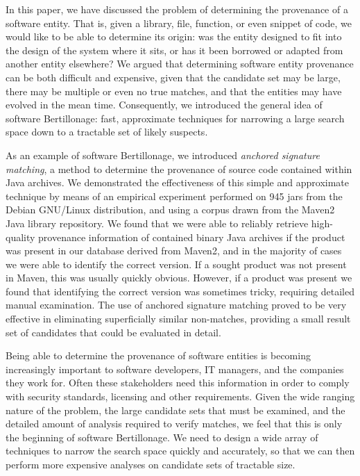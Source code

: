 \label{sec:conclusion}
\label{concl}

In this paper, we have discussed the problem of determining the provenance
of a software entity.  That is, given a library, file, function, or even
snippet of code, we would like to be able to determine its origin:  was the
entity designed to fit into the design of the system where it sits, or has
it been borrowed or adapted from another entity elsewhere?  We argued that
determining software entity provenance can be both difficult and expensive,
given that the candidate set may be large, there may be multiple or even no
true matches, and that the entities may have evolved in the mean time.
Consequently, we introduced the general idea of software Bertillonage:
fast, approximate techniques for narrowing a large search space down to a
tractable set of likely suspects.

As an example of software Bertillonage, we introduced \emph{anchored
signature matching}, a method to determine the provenance of source code
contained within Java archives.  We demonstrated the effectiveness of this
simple and approximate technique by means of an empirical experiment
performed on 945 jars from the Debian GNU/Linux distribution, and using a corpus drawn from
the Maven2 Java library repository.  We found that we were able to reliably
retrieve high-quality provenance information of contained binary Java archives
if the product was present in our database derived from Maven2, and in the majority of cases we were
able to identify the correct version.  If a sought product was not present
in Maven, this was usually quickly obvious.  However, if a product was
present we found that identifying the correct version was sometimes tricky,
requiring detailed manual examination.  The use of anchored signature
matching proved to be very effective in eliminating superficially similar
non-matches, providing a small result set of candidates that could be
evaluated in detail.

Being able to determine the provenance of software entities is becoming
increasingly important to software developers, IT managers, and the
companies they work for. Often these stakeholders need this information  in
order to comply with security standards, licensing and other requirements.
Given the wide ranging nature of the problem, the large candidate sets that
must be examined, and the detailed amount of analysis required to verify
matches, we feel that this is only the beginning of software Bertillonage.
We need to design a wide array of techniques to narrow the search space
quickly and accurately, so that we can then perform more expensive analyses
on candidate sets of tractable size.


